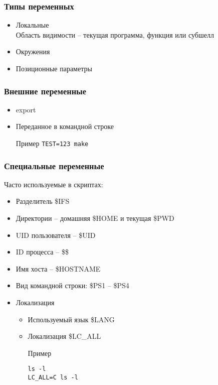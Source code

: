 \begin{frame}
	\frametitle{Типы переменных}
	\begin{itemize}
		\item Локальные\\
		    Область видимости -- текущая программа, функция или субшелл
		\item Окружения
		\item Позиционные параметры
	\end{itemize}
\end{frame}



\begin{frame}
	\frametitle{Внешние переменные}


	\begin{itemize}
		\item export
		\item Переданное в командной строке \\
			\begin{block}{Пример}
				{\tt TEST=123 make}
			\end{block}
	\end{itemize}
\end{frame}


\begin{frame}[fragile]
	\frametitle{Специальные переменные}

	Часто используемые в скриптах:

	\begin{itemize}
		\item Разделитель \$IFS
		\item Директории -- домашняя \$HOME и текущая \$PWD
		\item UID пользователя -- \$UID
		\item ID процесса -- \$\$
		\item Имя хоста -- \$HOSTNAME
		\item Вид командной строки: \$PS1 -- \$PS4
		\item Локализация
			\begin{itemize}
				\item Используемый язык \$LANG
				\item Локализация \$LC\_ALL
					\begin{block}{Пример}
						\begin{lstlisting}
ls -l 
LC_ALL=C ls -l
						\end{lstlisting}
					\end{block}
			\end{itemize}
	\end{itemize}

\end{frame}



